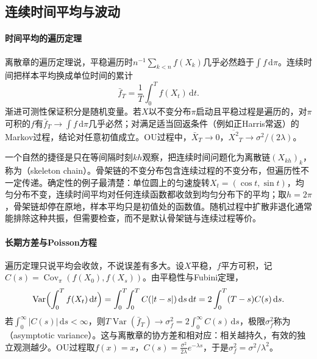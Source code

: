 \subsection{连续时间平均与波动}
\label{sec:ctsp-time-average}

\paragraph{时间平均的遍历定理}
离散章的遍历定理说，平稳遍历时$n^{-1}\sum_{k<n}f(X_k)$几乎必然趋于$\int f\,\mathrm d\pi$。连续时间把样本平均换成单位时间的累计
\begin{equation}
  \bar f_T=\frac1T\int_0^Tf(X_t)\,\mathrm dt .
  \label{eq:ctsp-time-average}
\end{equation}
渐进可测性保证积分是随机变量。若$X$以不变分布$\pi$启动且平稳过程是遍历的，对$\pi$可积的$f$有$\bar f_T\to\int f\,\mathrm d\pi$几乎必然；对满足适当回返条件（例如正Harris常返）的Markov过程，结论对任意初值成立。OU过程中，$\bar X_T\to0$，$\overline{X^2}_T\to\sigma^2/(2\lambda)$。

一个自然的捷径是只在等间隔时刻$kh$观察，把连续时间问题化为离散链$(X_{kh})_k$，称为（skeleton chain）。骨架链的不变分布包含连续过程的不变分布，但遍历性不一定传递。确定性的例子最清楚：单位圆上的匀速旋转$X_t=(\cos t,\sin t)$，均匀分布不变，连续时间平均对任何连续函数都收敛到均匀分布下的平均；取$h=2\pi$，骨架链却停在原地，样本平均只是初值处的函数值。随机过程中扩散非退化通常能排除这种共振，但需要检查，而不是默认骨架链与连续过程等价。

\paragraph{长期方差与Poisson方程}
遍历定理只说平均会收敛，不说误差有多大。设$X$平稳，$f$平方可积，记$C(s)=\operatorname{Cov}_\pi(f(X_0),f(X_s))$。由平稳性与Fubini定理，
\[
  \operatorname{Var}\Bigl(\int_0^Tf(X_t)\,\mathrm dt\Bigr)=\int_0^T\!\!\int_0^TC(|t-s|)\,\mathrm ds\,\mathrm dt=2\int_0^T(T-s)C(s)\,\mathrm ds .
\]
若$\int_0^\infty|C(s)|\,\mathrm ds<\infty$，则$T\operatorname{Var}(\bar f_T)\to\sigma_f^2=2\int_0^\infty C(s)\,\mathrm ds$，极限$\sigma_f^2$称为（asymptotic variance）。这与离散章的协方差和相对应：相关越持久，有效的独立观测越少。OU过程取$f(x)=x$，$C(s)=\frac{\sigma^2}{2\lambda}e^{-\lambda s}$，于是$\sigma_f^2=\sigma^2/\lambda^2$。

